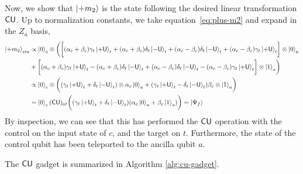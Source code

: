 \documentclass[11pt]{article}
\begin{document}
Now, we show that $\ket{+m_2}$ is the state following the desired linear transformation $\mathsf{CU}$.
Up to normalization constants, we take equation~\eqref{eq:plus-m2} and expand in the $Z_a$ basis,
{\small
\begin{align}
    \ket{+m_2}_{cta}&\propto\ket{0}_c\otimes \biggl( \biggl[ (\alpha_c+\beta_c)\gamma_t\ket{+\mathsf{U}}_t+(\alpha_c+\beta_c)\delta_t\ket{-\mathsf{U}}_t + (\alpha_c-\beta_c)\delta_t\ket{-\mathsf{U}}_t
    + (\alpha_c-\beta_c)\gamma_t\ket{+\mathsf{U}}_t\biggr]\otimes \ket{0}_a\notag\\
    &+ \biggl[(\alpha_c+\beta_c)\gamma_t\ket{+\mathsf{U}}_t
    - (\alpha_c+\beta_c)\delta_t\ket{-\mathsf{U}}_t + (\alpha_c-\beta_c)\delta_t\ket{-\mathsf{U}}_t
    - (\alpha_c-\beta_c)\gamma_t\ket{+\mathsf{U}}_t\biggr]\otimes \ket{1}_a\biggr)\notag\\
    &\propto \ket{0}_c\otimes  \biggl((\gamma_t\ket{+\mathsf{U}}_t +\delta_t\ket{-\mathsf{U}}_t) \otimes \alpha_c \ket{0}_a + (\gamma_t\ket{+\mathsf{U}}_t -\delta_t\ket{-\mathsf{U}}_t) \beta_c\otimes \ket{1}_a\biggr)\\
    &=\ket{0}_c (\mathsf{CU})_{at} \biggl( (\gamma_t\ket{+\mathsf{U}}_t + \delta_t \ket{-\mathsf{U}}_t) (\alpha_c\ket{0}_a+ \beta_c\ket{1}_a) \biggr) = \ket{\Psi_f}
\end{align}}
By inspection, we can see that this has performed the $\mathsf{CU}$ operation with the control on the input state of $c$, and the target on $t$.
Furthermore, the state of the control qubit has been teleported to the ancilla qubit $a$.

The $\mathsf{CU}$ gadget is summarized in Algorithm \ref{alg:cu-gadget}.
\end{document}

